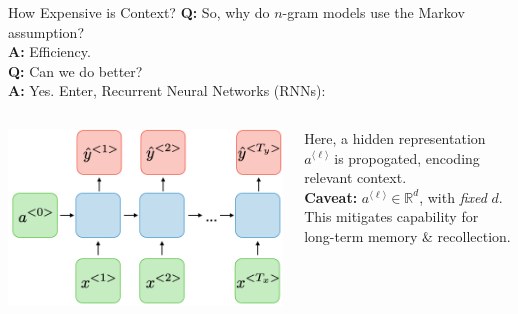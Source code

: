 \documentclass{beamer}
\begin{document}
\begin{frame}{How Expensive is Context?}
	\textbf{Q:} So, why do $n$-gram models use the Markov assumption? \pause \\
	\textbf{A:} Efficiency. \pause \newline \\

	\textbf{Q:} Can we do better? \pause \\
	\textbf{A:} Yes. Enter, Recurrent Neural Networks (RNNs):

	\begin{columns}
		\begin{column}{.5\textwidth}
			\begin{center}
				\includegraphics[width=\textwidth]{img/rnn.png} 
			\end{center} \pause
		\end{column}
		\begin{column}{.5\textwidth}
			Here, a hidden representation $a^{\langle \ell \rangle}$ is propogated, encoding relevant context. \pause \newline \\
			\textbf{Caveat:} $a^{\langle \ell \rangle} \in \mathbb{R}^d$, with \textit{fixed} $d$. \pause \\
			This mitigates capability for long-term memory \& recollection.
		\end{column}
	\end{columns}
\end{frame}
\end{document}

